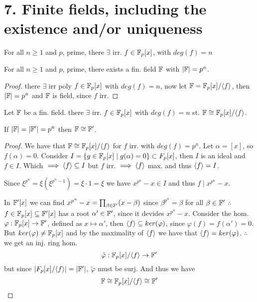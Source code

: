 \chapter*{7. Finite fields, including the existence and/or uniqueness}
\begin{theorem}
  For all $n \geq 1$ and $p$, prime, there $\exists$ irr. $f \in \mathbb{F}_{p}[x]$, with $deg(f) = n$
\end{theorem}

\begin{corollary}
  For all $n \geq 1$ and $p$, prime, there exists a fin. field $\mathbb{F}$ with $|\mathbb{F}| = p^{n}$.
\end{corollary}
\begin{proof}
  there $\exists$ irr poly $f \in \mathbb{F}_{p}[x]$ with $deg(f) = n$, now let $\mathbb{F} = \mathbb{F}_{p}[x] / \langle f\rangle$, then $|\mathbb{F}| = p^{n}$  and $\mathbb{F}$ is field, since $f$ irr.
\end{proof}

\begin{lemma}
  Let $\mathbb{F}$ be a fin. field. there $\exists$ irr. $f \in \mathbb{F}_{p}[x]$ with $deg(f) = n$ st. $\mathbb{F} \cong \mathbb{F}_p[x] / \langle f\rangle$.
\end{lemma}


\begin{theorem}
If $\lvert \mathbb{F} \rvert = \lvert \mathbb{F}' \rvert = p^{n}$ then $\mathbb{F} \cong \mathbb{F}'$.
\end{theorem}
\begin{proof}
  We have that $\mathbb{F} \cong \mathbb{F}_{p}[x] / \langle f\rangle$ for $f$ irr. with $deg(f) = p^{n}$. Let $\alpha = [x]$, so $f(\alpha) = 0$. Consider $I = \{g \in \mathbb{F}_{p}[x] \mid g(\alpha) = 0\} \subset F_{p}[x]$, then $I$ is an ideal and $f \in I$. Which $\implies \langle f\rangle \subseteq I$ but $f$ irr. $\implies \langle f\rangle$ max. and thus $\langle f\rangle = I$. \item

  Since $\xi^{p^{n}} = \xi (\xi^{p^{n} - 1}) = \xi \cdot 1 = \xi$ we have $x^{p^{n}} - x \in I$ and thus $f \mid x^{p^{n}} - x$.

  In $\mathbb{F}'[x]$ we can find $x^{p^{n}} - x = \prod_{\beta \in \mathbb{F}'} (x - \beta)$ since $\beta^{p^{n}} = \beta$ for all $\beta \in \mathbb{F}'$
  $\therefore$ $f \in \mathbb{F}_{p}[x] \subseteq \mathbb{F}'[x]$ has a root $\alpha' \in \mathbb{F}'$, since it devides $x^{p^{n}} - x$. Consider the hom. $\varphi: \mathbb{F}_{p}[x] \to \mathbb{F}'$, defined as $x \mapsto \alpha'$, then $\langle f\rangle \subseteq ker(\varphi)$, since $\varphi(f) = f(\alpha') = 0$. But $ker(\varphi) \neq \mathbb{F}_{p}[x]$ and by the maximality of $\langle f\rangle$ we have that $\langle f\rangle = ker(\varphi)$. $\therefore$ we get an inj. ring hom.
  \begin{equation*}
    \tilde{\varphi}: \mathbb{F}_{p}[x] / \langle f\rangle \to \mathbb{F}'
  \end{equation*}
  but since $\lvert F_{p}[x] / \langle f\rangle\rvert = \lvert \mathbb{F}' \rvert$, $\tilde{\varphi}$ must be surj. And thus we have
  \begin{equation*}
    \mathbb{F} \cong \mathbb{F}_{p}[x] / \langle f\rangle \cong \mathbb{F}'
  \end{equation*}
\end{proof}
